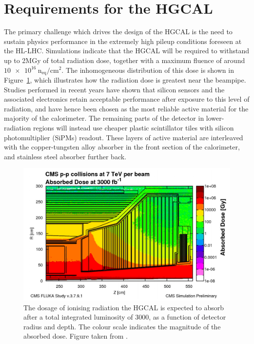 \section{Requirements for the HGCAL}

The primary challenge which drives the design of the HGCAL is the need to 
sustain physics performance in the extremely high pileup conditions foreseen at the HL-LHC.
Simulations indicate that the HGCAL will be required to withstand up to 2MGy of total radiation dose, 
together with a maximum fluence of around $\SI{10e16}{\textrm{n}_{\textrm{eq}}/\textrm{cm}^2}.$
The inhomogeneous distribution of this dose is shown in Figure~\ref{fig:hgcal_Dose}, 
which illustrates how the radiation dose is greatest near the beampipe.
Studies performed in recent years have shown that silicon sensors and the associated electronics 
retain acceptable performance after exposure to this level of radiation, 
and have hence been chosen as the most reliable active material for the majority of the calorimeter.
The remaining parts of the detector in lower-radiation regions will instead use 
cheaper plastic scintillator tiles with silicon photomultiplier (SiPMs) readout.
These layers of active material are interleaved with the copper-tungsten alloy absorber 
in the front section of the calorimeter, and stainless steel absorber further back.

\begin{figure}[h!]
  \centering
  \includegraphics[width=\textwidth]{Figures/HGCAL/Dose.png}
  \caption[Expected radiation dose for the HGCAL.]
  {
    The dosage of ionising radiation the HGCAL is expected to absorb 
    after a total integrated luminosity of \SI{3000}{\fbinv}, 
    as a function of detector radius and depth.
    The colour scale indicates the magnitude of the absorbed dose.
    Figure taken from \cite{HGCAL}.
  }
  \label{fig:hgcal_Dose}
\end{figure}

